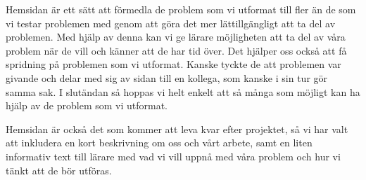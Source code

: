 \textcolor{Mahogany}{Hemsidan är ett sätt att förmedla de problem som vi utformat till fler än de som vi testar problemen med genom att göra det mer lättillgängligt att ta del av problemen. Med hjälp av denna kan vi ge lärare möjligheten att ta del av våra problem när de vill och känner att de har tid över. Det hjälper oss också att få spridning på problemen som vi utformat. Kanske tyckte de att problemen var givande och delar med sig av sidan till en kollega, som kanske i sin tur gör samma sak. I slutändan så hoppas vi helt enkelt att så många som möjligt kan ha hjälp av de problem som vi utformat.}

\textcolor{Mahogany}{Hemsidan är också det som kommer att leva kvar efter projektet, så vi har valt att inkludera en kort beskrivning om oss och vårt arbete, samt en liten informativ text till lärare med vad vi vill uppnå med våra problem och hur vi tänkt att de bör utföras.}